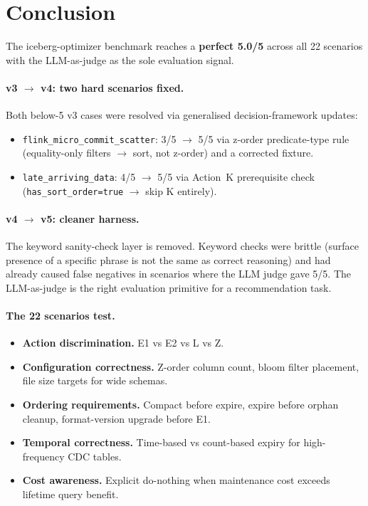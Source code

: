 \documentclass[11pt,a4paper]{article}
\newcommand{\code}[1]{\texttt{#1}}
\begin{document}
\section{Conclusion}

The iceberg-optimizer benchmark reaches a \textbf{perfect 5.0/5} across all
22 scenarios with the LLM-as-judge as the sole evaluation signal.

\paragraph{v3 $\to$ v4: two hard scenarios fixed.}
Both below-5 v3 cases were resolved via generalised decision-framework updates:
\begin{itemize}
  \item \code{flink\_micro\_commit\_scatter}: 3/5 $\to$ 5/5 via z-order
        predicate-type rule (equality-only filters $\to$ sort, not z-order)
        and a corrected fixture.
  \item \code{late\_arriving\_data}: 4/5 $\to$ 5/5 via Action~K prerequisite
        check (\code{has\_sort\_order=true} $\to$ skip K entirely).
\end{itemize}

\paragraph{v4 $\to$ v5: cleaner harness.}
The keyword sanity-check layer is removed.  Keyword checks were brittle (surface
presence of a specific phrase is not the same as correct reasoning) and had
already caused false negatives in scenarios where the LLM judge gave 5/5.  The
LLM-as-judge is the right evaluation primitive for a recommendation task.

\paragraph{The 22 scenarios test.}
\begin{itemize}
  \item \textbf{Action discrimination.}  E1 vs E2 vs L vs Z.
  \item \textbf{Configuration correctness.}  Z-order column count, bloom filter
        placement, file size targets for wide schemas.
  \item \textbf{Ordering requirements.}  Compact before expire, expire before
        orphan cleanup, format-version upgrade before E1.
  \item \textbf{Temporal correctness.}  Time-based vs count-based expiry for
        high-frequency CDC tables.
  \item \textbf{Cost awareness.}  Explicit do-nothing when maintenance cost
        exceeds lifetime query benefit.
\end{itemize}
\end{document}
